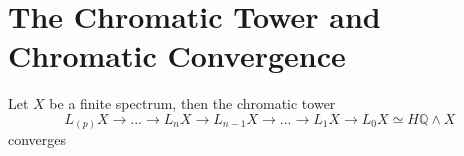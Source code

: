 \section{The Chromatic Tower and Chromatic Convergence}\label{sec:chromatic-results-chromaticconvergence}
\begin{theorem}
    Let $X$ be a finite spectrum, then the chromatic tower
    \[
    L_{(p)}X\to ... \to L_nX\to L_{n-1}X\to ...\to L_1 X\to L_0X\simeq H\mathbb{Q}\wedge X
    \]converges
\end{theorem}